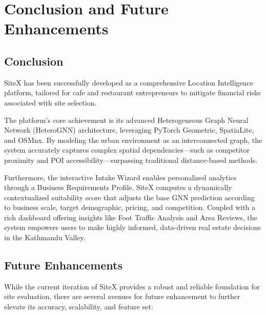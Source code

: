 \chapter{Conclusion and Future Enhancements}

\section{Conclusion}

SiteX has been successfully developed as a comprehensive Location Intelligence platform, tailored for cafe and restaurant entrepreneurs to mitigate financial risks associated with site selection.

The platform's core achievement is its advanced Heterogeneous Graph Neural Network (HeteroGNN) architecture, leveraging PyTorch Geometric, SpatiaLite, and OSMnx. By modeling the urban environment as an interconnected graph, the system accurately captures complex spatial dependencies—such as competitor proximity and POI accessibility—surpassing traditional distance-based methods.

Furthermore, the interactive Intake Wizard enables personalized analytics through a Business Requirements Profile. SiteX computes a dynamically contextualized suitability score that adjusts the base GNN prediction according to business scale, target demographic, pricing, and competition. Coupled with a rich dashboard offering insights like Foot Traffic Analysis and Area Reviews, the system empowers users to make highly informed, data-driven real estate decisions in the Kathmandu Valley.

\section{Future Enhancements}

While the current iteration of SiteX provides a robust and reliable foundation for site evaluation, there are several avenues for future enhancement to further elevate its accuracy, scalability, and feature set:

